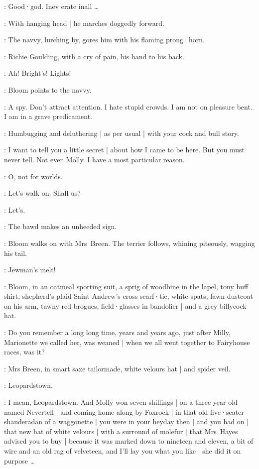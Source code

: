 \Richie[2]:
Good·god.
Inev erate inall \ldots

:
With hanging head |
he marches doggedly forward.

:
The navvy,
lurching by,
gores him with his flaming prong·horn.

:
Richie Goulding,
with a cry of pain,
his hand to his back.

\Richie:
Ah!
Bright's!
Lights!

:
Bloom points to the navvy.

\Bloom:
A spy.
Don't attract attention.
I hate stupid crowds.
I am not on pleasure bent.
I am in a grave predicament.

\MrsBreen:
Humbugging and deluthering |
as per usual |
with your cock and bull story.

\Bloom:
I want to tell you a little secret |
about how I came to be here.
But you must never tell.
Not even Molly.
I have a most particular reason.

\MrsBreen:
O,
not for worlds.

\Bloom:
Let's walk on.
Shall us?

\MrsBreen:
Let's.

:
The bawd makes an unheeded sign.

:
Bloom walks on with Mrs~Breen.
The terrier follows,
whining piteously,
wagging his tail.

\Bawd[1]:
Jewman's melt!

:
Bloom,
in an oatmeal sporting suit,
a sprig of woodbine in the lapel,
tony buff shirt,
shepherd's plaid Saint Andrew's cross scarf·tie,
white spats,
fawn dustcoat on his arm,
tawny red brogues,
field·glasses in bandolier |
and a grey billycock hat.

\Bloom:
Do you remember a long long time,
years and years ago,
just after Milly,
Marionette we called her,
was weaned |
when we all went together to Fairyhouse races,
was it?

:
Mrs Breen,
in smart saxe tailormade,
white velours hat |
and spider veil.

\MrsBreen:
Leopardstown.

\Bloom:
I mean,
Leopardstown.
And Molly won seven shillings |
on a three year old named Nevertell |
and coming home along by Foxrock |
in that old five·seater shanderadan of a waggonette |
you were in your heyday then  |
and you had on |
that new hat of white velours |
with a surround of molefur |
that Mrs~Hayes
advised you to buy |
because it was marked down to nineteen and eleven,
a bit of wire and an old rag of velveteen,
and I'll lay you what you like |
she did it on purpose \ldots

